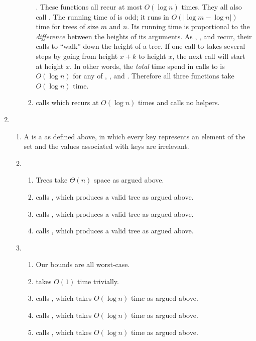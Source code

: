 \documentclass{article}
\begin{document}
\begin{enumerate}
\begin{enumerate}
\begin{enumerate}
      .  These functions all recur at most \(O(\log n)\)
      times.  They all also call .  The running time of
       is odd; it runs in \(O(|\log m - \log n|)\) time
      for trees of size \(m\) and \(n\).  Its running time is proportional to
      the \emph{difference} between the heights of its arguments.  As
      , , and  recur,
      their calls to  ``walk'' down the height of a tree.
      If one call to  takes several steps by going from
      height \(x+k\) to height \(x\), the next call will start at height \(x\).
      In other words, the \emph{total} time spend in calls to
       is \(O(\log n)\) for any of ,
      , and .  Therefore all three
      functions take \(O(\log n)\) time.
    \item {} calls  which recurs at \(O(\log n)\)
      times and calls no helpers.
    \end{enumerate}
  \end{enumerate}

\item
  \begin{enumerate}
  \item A  is a  as defined above, in which every key
    represents an element of the set and the values associated with keys are
    irrelevant.
  \item
    \begin{enumerate}
    \item Trees take \(\Theta(n)\) space as argued above.
    \item {} calls , which produces a valid tree
      as argued above.
    \item {} calls , which produces a valid tree as
      argued above.
    \item {} calls , which produces a valid
      tree as argued above.
    \end{enumerate}
  \item
    \begin{enumerate}
    \item Our bounds are all worst-case.
    \item {} takes \(O(1)\) time trivially.
    \item {} calls , which takes \(O(\log n)\) time
      as argued above.
    \item {} calls , which takes \(O(\log n)\) time
      as argued above.
    \item {} calls , which takes
      \(O(\log n)\) time as argued above.
    \end{enumerate}
  \end{enumerate}


\end{enumerate}
\end{document}
